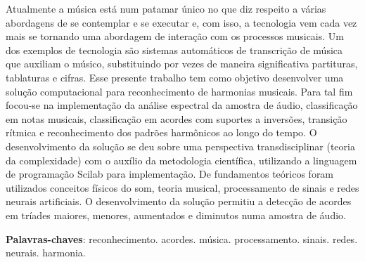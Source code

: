 \begin{resumo}
 Atualmente a música está num patamar único no que diz respeito a várias abordagens de se contemplar e se executar e, com isso, a tecnologia vem cada vez mais se tornando uma abordagem de interação com os processos musicais. Um dos exemplos de tecnologia são sistemas automáticos de transcrição de música que auxiliam o músico, substituindo por vezes de maneira significativa partituras, tablaturas e cifras. Esse presente trabalho tem como objetivo desenvolver uma solução computacional para reconhecimento de harmonias musicais. Para tal fim focou-se na implementação da análise espectral da amostra de áudio, classificação em notas musicais, classificação em acordes com suportes a inversões, transição rítmica e reconhecimento dos padrões harmônicos ao longo do tempo. O desenvolvimento da solução se deu sobre uma perspectiva transdisciplinar (teoria da complexidade) com o auxílio da metodologia científica, utilizando a linguagem de programação Scilab para implementação. De fundamentos teóricos foram utilizados conceitos físicos do som, teoria musical, processamento de sinais e redes neurais artificiais. O desenvolvimento da solução permitiu a detecção de acordes em tríades maiores, menores, aumentados e diminutos numa amostra de áudio.

 \vspace{\onelineskip}

 \noindent
 \textbf{Palavras-chaves}: reconhecimento. acordes. música. processamento. sinais. redes. neurais. harmonia.
\end{resumo}
